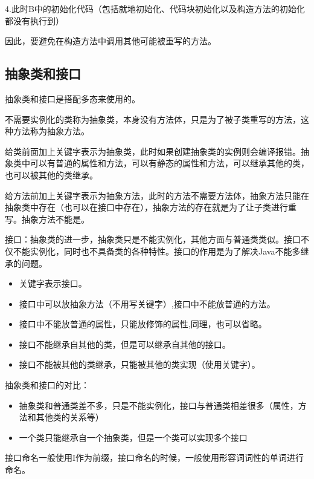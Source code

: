 \documentclass[a4paper]{report}
\begin{document}
4.此时B中的初始化代码（包括就地初始化、代码块初始化以及构造方法的初始化都没有执行到）

因此，要避免在构造方法中调用其他可能被重写的方法。

\subsection{抽象类和接口}
抽象类和接口是搭配多态来使用的。

不需要实例化的类称为抽象类，本身没有方法体，只是为了被子类重写的方法，这种方法称为抽象方法。

给类前面加上关键字表示为抽象类，此时如果创建抽象类的实例则会编译报错。抽象类中可以有普通的属性和方法，可以有静态的属性和方法，可以继承其他的类，也可以被其他的类继承。

给方法前加上关键字表示为抽象方法，此时的方法不需要方法体，抽象方法只能在抽象类中存在（也可以在接口中存在），抽象方法的存在就是为了让子类进行重写。抽象方法不能是。

接口：抽象类的进一步，抽象类只是不能实例化，其他方面与普通类类似。接口不仅不能实例化，同时也不具备类的各种特性。接口的作用是为了解决Java不能多继承的问题。

\begin{itemize}
\itemsep=0pt \parskip =0pt
\item {}关键字表示接口。
\item 接口中可以放抽象方法（不用写关键字）,接口中不能放普通的方法。
\item 接口中不能放普通的属性，只能放修饰的属性,同理，也可以省略。
\item 接口不能继承自其他的类，但是可以继承自其他的接口。
\item 接口不能被其他的类继承，只能被其他的类实现（使用关键字）。
    \\ 
\end{itemize}

抽象类和接口的对比：
\begin{itemize}
\itemsep=0pt \parskip =0pt
\item 抽象类和普通类差不多，只是不能实例化，接口与普通类相差很多（属性，方法和其他类的关系等）
\item 一个类只能继承自一个抽象类，但是一个类可以实现多个接口
\end{itemize}

接口命名一般使用I作为前缀，接口命名的时候，一般使用形容词词性的单词进行命名。
\end{document}
